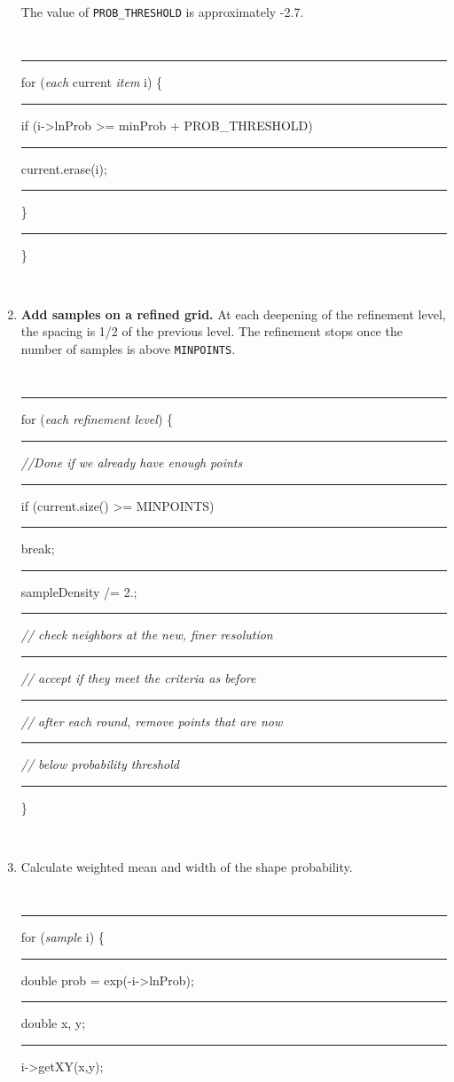 \documentclass[useAMS,usenatbib,usegraphicx]{mn2e}
\begin{document}
\begin{enumerate}
The value of {\tt PROB\_THRESHOLD} is approximately -2.7.  \\
\begin{boxit}
  {\tt 
  \rule{0.1in}{0in} for ({\it each} current {\it item} i) \{\\
  \rule{0.2in}{0in}    if (i->lnProb >= minProb + PROB\_THRESHOLD)\\
  \rule{0.3in}{0in}       current.erase(i); \\
  \rule{0.2in}{0in}    \}  \\
  \rule{0.1in}{0in} \} } \\
\end{boxit}
\item {\bf Add samples on a refined grid.}  
At each deepening of the refinement level, the spacing is 1/2 of the previous level. 
The refinement stops once the number of samples is above {\tt MINPOINTS}. \\
\begin{boxit}
{\tt 
 \rule{0.1in}{0in} for ({\it each refinement level}) \{ \\
 \rule{0.2in}{0in}    {\it //Done if we already have enough points} \\
 \rule{0.2in}{0in}    if (current.size() >= MINPOINTS) \\
 \rule{0.3in}{0in}      break; \\
 \rule{0.2in}{0in}    sampleDensity /= 2.; \\
 \rule{0.2in}{0in}    {\it // check neighbors at the new, finer resolution} \\
 \rule{0.2in}{0in}    {\it // accept if they meet the criteria as before} \\
 \rule{0.2in}{0in}    {\it // after each round, remove points that are now} \\
 \rule{0.2in}{0in}    {\it // below probability threshold} \\
 \rule{0.1in}{0in} \} } \\
\end{boxit}
\item Calculate weighted mean and width of the shape probability. \\
\begin{boxit}
{\tt 
 \rule{0.1in}{0in} for ({\it sample} i) \{ \\
 \rule{0.2in}{0in}     double prob = exp(-i->lnProb); \\
 \rule{0.2in}{0in}     double x, y;\\
 \rule{0.2in}{0in}     i->getXY(x,y);\\
}
\end{boxit}
\end{enumerate}
\end{document}

